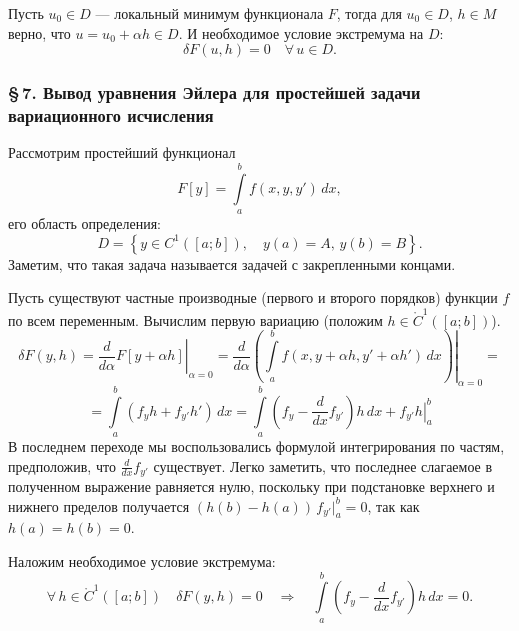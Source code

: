 \documentclass[12pt,a5paper]{book}
\begin{document}
	Пусть $u_0 \in D$ --- локальный минимум функционала $F$, тогда для $u_0 \in D$, $h \in M$ верно, что $u = u_0 + \alpha h \in D$. И необходимое условие экстремума на $D$:
	\begin{equation*}
		\delta F(u,h) = 0 \quad \forall\,u \in D.
	\end{equation*}
	
	\subsubsection*{\S\,7. Вывод уравнения Эйлера для простейшей задачи вариационного исчисления}
	
	Рассмотрим простейший функционал
	\begin{equation}\label{simple_fun}
		F[y] = \int\limits_a^b f(x, y, y')\,dx,
	\end{equation}
	его область определения:
	\begin{equation*}
		D = \left\{y \in C^1([a;b]), \quad y(a) = A,\, y(b) = B\right\}.
	\end{equation*}
	Заметим, что такая задача называется задачей с закрепленными концами.
	
	Пусть существуют частные производные (первого и второго порядков) функции $f$ по всем переменным. Вычислим первую вариацию (положим $h \in \mathring{C}^1([a;b])$).
	\begin{equation*}
		\delta F(y,h) = \left.\frac{d}{d\alpha}F[y + \alpha h]\right|_{\alpha=0} = \left.\frac{d}{d\alpha}\left(\int\limits_a^b f(x, y + \alpha h, y' + \alpha h')\,dx\right)\right|_{\alpha=0} =
	\end{equation*}
	\begin{equation*}
		= \int\limits_a^b \left(f_yh + f_{y'}h'\right)\,dx = \int\limits_a^b \left(f_y - \frac{d}{dx} f_{y'}\right)h\,dx + \left.f_{y'}h\right|_a^b
	\end{equation*}
	В последнем переходе мы воспользовались формулой интегрирования по частям, предположив, что $\frac{d}{dx}f_{y'}$ существует. Легко заметить, что последнее слагаемое в полученном выражение равняется нулю, поскольку при подстановке верхнего и нижнего пределов получается $(h(b) - h(a))\,f_{y'}|_a^b = 0$, так как $h(a) = h(b) = 0$.
	
	Наложим необходимое условие экстремума:
	\begin{equation*}
		\forall\,h \in \mathring{C}^1([a;b]) \quad \delta F(y,h) = 0 \quad \Rightarrow \quad \int\limits_a^b \left(f_y - \frac{d}{dx} f_{y'}\right)h\,dx = 0.
	\end{equation*}
	
\end{document}
